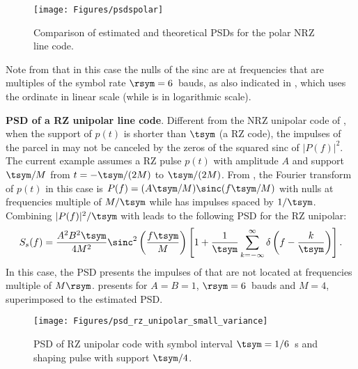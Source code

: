 \begin{figure}[htbp]
\centering
\texttt{[image: Figures/psdspolar]}
\caption{Comparison of estimated and theoretical PSDs for the polar NRZ line code.\label{fig:psdspolar}}
\end{figure}


Note from  that in this case the nulls of the sinc are at frequencies that are multiples
of the symbol rate $\rsym = 6$~bauds, as also indicated in , which uses 
the ordinate in linear scale (while  is in logarithmic scale).
\eExample 


\bExample \textbf{PSD of a RZ unipolar line code}.
\label{ex:psdRZUnipolar}
Different from the NRZ unipolar code of , when the support of $p(t)$ is shorter
than $\tsym$ (a RZ code), the impulses of the parcel in  may not be
canceled by the zeros of the squared sinc of $|P(f)|^2$. The current example assumes a RZ pulse
$p(t)$ with amplitude $A$ and support $\tsym/M$ from $t=-\tsym/(2M)$ to $\tsym/(2M)$. From 
, the Fourier transform  of $p(t)$ in this case is 
$P(f)= (A \tsym/M) \sinc(f \tsym / M)$ with nulls at frequencies multiple of $M/\tsym$ while  has impulses spaced by $1/\tsym$. Combining $|P(f)|^2/\tsym$ with  leads
to the following PSD for the RZ unipolar:
\begin{equation}
S_s(f) = \frac{A^2 B^2 \tsym}{4 M^2} \sinc^2 \left(\frac{f \tsym}{M} \right) \left[ 1 + \frac{1}{\tsym} \sum^{\infty}_{k=-\infty} \delta \left(f - \frac{k}{\tsym} \right) \right].
\label{eq:rzUnipolarPSD}
\end{equation}
In this case, the PSD presents the impulses of  that are not located 
at frequencies multiple of $M \rsym$.
 presents   for $A=B=1$, $\rsym=6$~bauds and $M=4$, superimposed to the estimated PSD. 

\begin{figure}[htbp]
\centering
\texttt{[image: Figures/psd\_rz\_unipolar\_small\_variance]}
\caption[{PSD of RZ unipolar code.}]{PSD of RZ unipolar code with symbol interval $\tsym=1/6$~s and shaping pulse with support $\tsym/4$.\label{fig:psd_rz_unipolar_small_variance}}
\end{figure}

